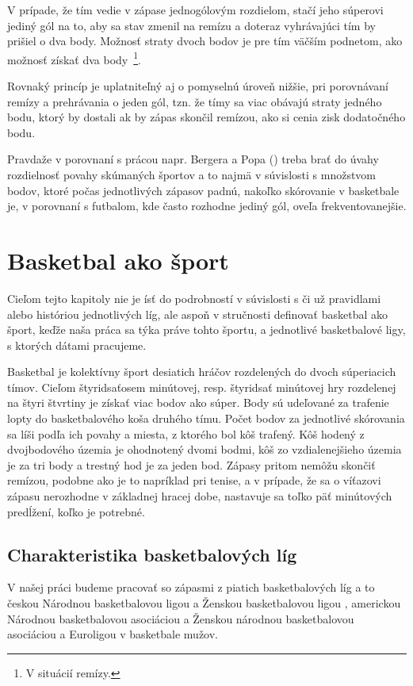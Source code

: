 \documentclass[
  digital, %
  oneside, %
  notable,   %
  lof,     %
  lot,     %
]{fithesis3}
\begin{document}
		V prípade, že tím vedie v zápase jednogólovým rozdielom, stačí jeho súperovi jediný gól na to, aby sa stav zmenil na remízu a doteraz vyhrávajúci tím by prišiel o dva body. Možnosť straty dvoch bodov je pre tím väčším podnetom, ako možnosť získať dva body~\footnote{V situácií remízy.}. 
	
		Rovnaký princíp je uplatniteľný aj o pomyselnú úroveň nižšie, pri porovnávaní remízy a prehrávania o jeden gól, tzn. že tímy sa viac obávajú straty jedného bodu, ktorý by dostali ak by zápas skončil remízou, ako si cenia zisk dodatočného bodu. \parencite[s.~1768]{schneemann2017}
		
		Pravdaže v porovnaní s prácou napr. Bergera a Popa (\citeyear{berger2011}) treba brať do úvahy rozdielnosť povahy skúmaných športov a to najmä v súvislosti s množstvom bodov, ktoré počas jednotlivých zápasov padnú, nakoľko skórovanie v basketbale je, v porovnaní s futbalom, kde často rozhodne jediný gól, oveľa frekventovanejšie.
				
	\chapter{Basketbal ako šport}
	Cieľom tejto kapitoly nie je ísť do podrobností v súvislosti s či už pravidlami alebo históriou jednotlivých líg, ale aspoň v stručnosti definovať basketbal ako šport, keďže naša práca sa týka práve tohto športu, a jednotlivé basketbalové ligy, s ktorých dátami pracujeme.
	
	Basketbal je kolektívny šport desiatich hráčov rozdelených do dvoch súperiacich tímov. Cieľom štyridsaťosem minútovej, resp. štyridsať minútovej hry rozdelenej na štyri štvrtiny je získať viac bodov ako súper. Body sú udeľované za trafenie lopty do basketbalového koša druhého tímu. Počet bodov za jednotlivé skórovania sa líši podľa ich povahy a miesta, z ktorého bol kôš trafený. Kôš hodený z dvojbodového územia je ohodnotený dvomi bodmi, kôš zo vzdialenejšieho územia je za tri body a trestný hod je za jeden bod. Zápasy pritom nemôžu skončiť remízou, podobne ako je to napríklad pri tenise, a v prípade, že sa o víťazovi zápasu nerozhodne v základnej hracej dobe, nastavuje sa toľko päť minútových predĺžení, koľko je potrebné.
	
		\section{Charakteristika basketbalových líg}
		V našej práci budeme pracovať so zápasmi z piatich basketbalových líg a to českou Národnou basketbalovou ligou a Ženskou basketbalovou ligou , americkou Národnou basketbalovou asociáciou a Ženskou národnou basketbalovou asociáciou a Euroligou v basketbale mužov.
		
\end{document}
